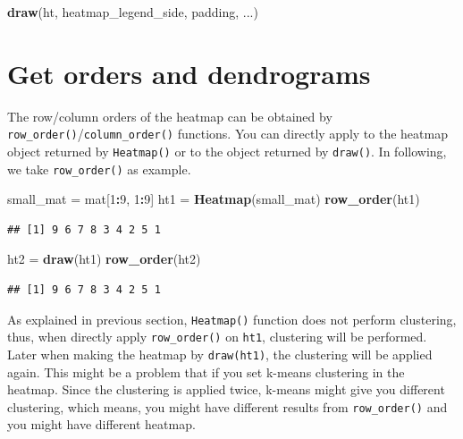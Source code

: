 \documentclass[]{book}
\newenvironment{Shaded}{\begin{snugshade}}{\end{snugshade}}
\newcommand{\KeywordTok}[1]{\textcolor[rgb]{0.13,0.29,0.53}{\textbf{#1}}}
\newcommand{\DecValTok}[1]{\textcolor[rgb]{0.00,0.00,0.81}{#1}}
\newcommand{\StringTok}[1]{\textcolor[rgb]{0.31,0.60,0.02}{#1}}
\newcommand{\OperatorTok}[1]{\textcolor[rgb]{0.81,0.36,0.00}{\textbf{#1}}}
\newcommand{\NormalTok}[1]{#1}
\theoremstyle{definition}
\theoremstyle{definition}
\theoremstyle{definition}
\theoremstyle{remark}
\begin{document}
\begin{Shaded}
\begin{Highlighting}[]
\KeywordTok{draw}\NormalTok{(ht, heatmap_legend_side, padding, ...)}
\end{Highlighting}
\end{Shaded}

\section{Get orders and
dendrograms}\label{get-orders-and-dendrograms-from-heatmap}

The row/column orders of the heatmap can be obtained by
\texttt{row\_order()}/\texttt{column\_order()} functions. You can
directly apply to the heatmap object returned by \texttt{Heatmap()} or
to the object returned by \texttt{draw()}. In following, we take
\texttt{row\_order()} as example.

\begin{Shaded}
\begin{Highlighting}[]
\NormalTok{small_mat =}\StringTok{ }\NormalTok{mat[}\DecValTok{1}\OperatorTok{:}\DecValTok{9}\NormalTok{, }\DecValTok{1}\OperatorTok{:}\DecValTok{9}\NormalTok{]}
\NormalTok{ht1 =}\StringTok{ }\KeywordTok{Heatmap}\NormalTok{(small_mat)}
\KeywordTok{row_order}\NormalTok{(ht1)}
\end{Highlighting}
\end{Shaded}

\begin{verbatim}
## [1] 9 6 7 8 3 4 2 5 1
\end{verbatim}

\begin{Shaded}
\begin{Highlighting}[]
\NormalTok{ht2 =}\StringTok{ }\KeywordTok{draw}\NormalTok{(ht1)}
\KeywordTok{row_order}\NormalTok{(ht2)}
\end{Highlighting}
\end{Shaded}

\begin{verbatim}
## [1] 9 6 7 8 3 4 2 5 1
\end{verbatim}

As explained in previous section, \texttt{Heatmap()} function does not
perform clustering, thus, when directly apply \texttt{row\_order()} on
\texttt{ht1}, clustering will be performed. Later when making the
heatmap by \texttt{draw(ht1)}, the clustering will be applied again.
This might be a problem that if you set k-means clustering in the
heatmap. Since the clustering is applied twice, k-means might give you
different clustering, which means, you might have different results from
\texttt{row\_order()} and you might have different heatmap.
\end{document}
